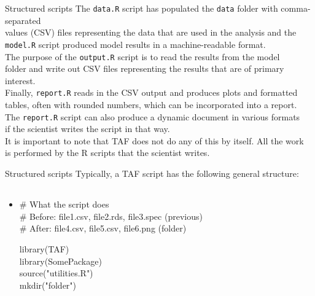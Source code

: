 \documentclass[aspectratio=169]{beamer}
\begin{document}

\begin{frame}{Structured scripts}\small
  The {\tt\darkblue data.R} script has populated the {\tt data} folder with
  comma-separated\\
  values (CSV) files representing the
  {\green data that are used in the analysis} and the\\
  {\tt model.R} script produced model results in a machine-readable
  format.\\[3ex]

  The purpose of the {\tt\darkblue output.R} script is to
  {\green read the results} from the model\\
  folder and write out CSV files representing the results that are of primary
  interest.\\[3ex]

  Finally, {\tt\darkblue report.R} reads in the CSV output and produces
  {\green plots and formatted\\
    tables}, often with rounded numbers, which can be incorporated into a
  report.\\[3ex]

  The {\tt\darkblue report.R} script can also produce a
  {\green dynamic document} in various formats\\
  if the scientist writes the script in that way.\\[3ex]

  It is important to note that TAF does not do any of this by itself. All the
  work\\
  is performed by the R scripts that the scientist writes.\\[3ex]
\end{frame}


\begin{frame}{Structured scripts}\small
  Typically, a TAF script has the following general structure:\\[3ex]\tt\fns
  \begin{itemize}\item[]
    \begin{gray}
      \# What the script does\\[1em]
      \# Before: file1.csv, file2.rds, file3.spec (previous)\\
      \# After:  file4.csv, file5.csv, file6.png (folder)\\[1em]
    \end{gray}
    {\blue library}(TAF)\\
    {\blue library}(SomePackage)\\
    {\blue source}("utilities.R")\\[1em]
    {\blue mkdir}("folder")\\[3ex]
  \end{itemize}
\end{frame}
\end{document}
